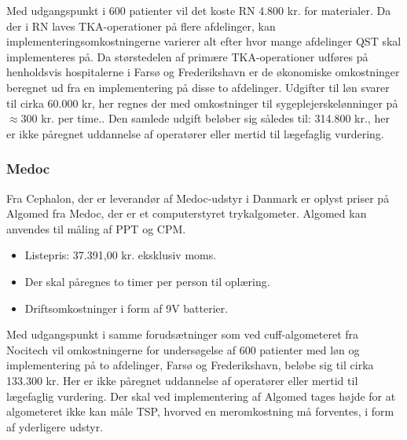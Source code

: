 Med udgangspunkt i 600 patienter vil det koste RN 4.800 kr. for materialer. Da der i RN laves TKA-operationer på flere afdelinger, kan implementeringsomkostningerne varierer alt efter hvor mange afdelinger QST skal implementeres på. Da størstedelen af primære TKA-operationer udføres på henholdsvis hospitalerne i Farsø og Frederikshavn er de økonomiske omkostninger beregnet ud fra en implementering på disse to afdelinger. Udgifter til løn svarer til cirka 60.000 kr, her regnes der med omkostninger til sygeplejerskelønninger på $\approx 300$ kr. per time.\citep{DST1}\citep{DST2}. Den samlede udgift beløber sig således til: 314.800 kr., her er ikke påregnet uddannelse af operatører eller mertid til lægefaglig vurdering.

\subsubsection{Medoc}
Fra Cephalon, der er leverandør af Medoc-udstyr i Danmark er oplyst priser på Algomed fra Medoc, der er et computerstyret trykalgometer. Algomed kan anvendes til måling af PPT og CPM. \citep{AlgomedOnline} \citep{AlgomedData}

\begin{itemize}  
\item Listepris: 37.391,00 kr. eksklusiv moms.
\item Der skal påregnes to timer per person til oplæring.
\item Driftsomkostninger i form af 9V batterier.
\end{itemize}

Med udgangspunkt i samme forudsætninger som ved cuff-algometeret fra Nocitech vil omkostningerne for undersøgelse af 600 patienter med løn og implementering på to afdelinger, Farsø og Frederikshavn, beløbe sig til cirka 133.300 kr. Her er ikke påregnet uddannelse af operatører eller mertid til lægefaglig vurdering. Der skal ved implementering af Algomed tages højde for at algometeret  ikke kan måle TSP, hvorved en meromkostning må forventes, i form af yderligere udstyr.

